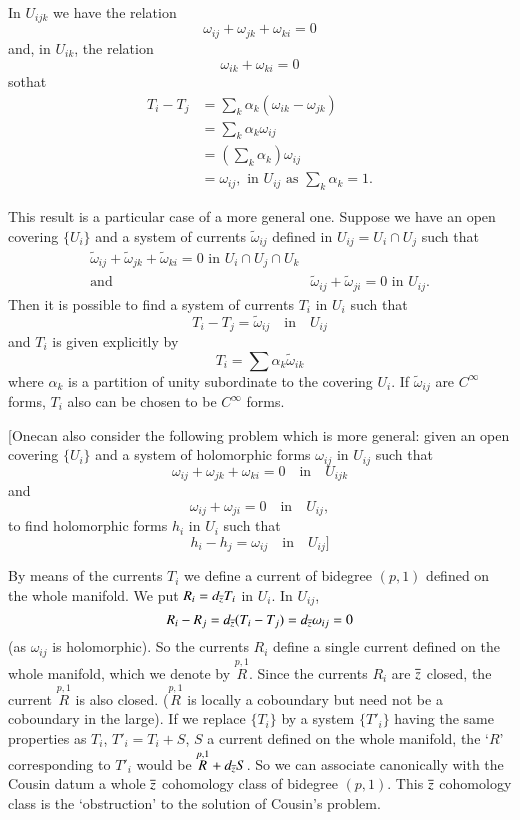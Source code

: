 In $U_{ijk}$ we have the relation
$$
\omega_{ij}+\omega_{jk}+\omega_{ki}=0
$$
and, in $U_{ik}$, the relation
$$
\omega_{ik}+\omega_{ki}=0
$$
so\pageoriginale that
\begin{align*}
T_{i}-T_{j} &= \sum_{k}\alpha_{k}(\omega_{ik}-\omega_{jk})\\
 &= \sum_{k}\alpha_{k}\omega_{ij}\\
 &= \left(\sum_{k}\alpha_{k}\right)\omega_{ij}\\
 &= \omega_{ij}, \text{ \  in \ } U_{ij} \text{ \  as \ }
\sum_{k}\alpha_{k}=1. 
\end{align*}

This result is a particular case of a more general one. Suppose we
have an open covering $\{U_{i}\}$ and a system of currents
$\widetilde{\omega}_{ij}$ defined in $U_{ij}=U_{i}\cap U_{j}$ such
that
\begin{align*}
 \widetilde{\omega}_{ij}
 +\widetilde{\omega}_{jk}+\widetilde{\omega}_{ki}=0 \text{ \  in \ }
 U_{i}\cap U_{j}\cap U_{k}\\
\text{and}\quad &\widetilde{\omega}_{ij}+\widetilde{\omega}_{ji}=0
\text{ \  in \ } U_{ij}.
\end{align*}
Then it is possible to find a system of currents $T_{i}$ in $U_{i}$
such that
$$
T_{i}-T_{j}=\widetilde{\omega}_{ij}\quad\text{in}\quad U_{ij}
$$
and $T_{i}$ is given explicitly by
$$
T_{i}=\sum \alpha_{k}\widetilde{\omega}_{ik}
$$
where $\alpha_{k}$ is a partition of unity subordinate to the covering
$U_{i}$. If $\widetilde{\omega}_{ij}$ are $C^{\infty}$ forms, $T_{i}$
also can be chosen to be $C^{\infty}$ forms. 

[One\pageoriginale can also consider the following problem which is
  more general: given an open covering $\{U_{i}\}$ and a system of
  holomorphic forms $\omega_{ij}$ in $U_{ij}$ such that
$$
\omega_{ij}+\omega_{jk}+\omega_{ki}=0\quad\text{in}\quad U_{ijk}
$$
and
$$
\omega_{ij}+\omega_{ji}=0\quad\text{in}\quad U_{ij},
$$
to find holomorphic forms $h_{i}$ in $U_{i}$ such that
$$
h_{i}-h_{j}=\omega_{ij}\quad\text{in}\quad U_{ij}]
$$

By means of the currents $T_{i}$ we define a current of bidegree
$(p,1)$ defined on the whole manifold. We put $R_{i}=d_{\overline{z}}T_{i}$
in $U_{i}$. In $U_{ij}$,
$$
R_{i}-R_{j}=d_{\overline{z}}(T_{i}-T_{j})=d_{\overline{z}}\omega_{ij}=0
$$
(as $\omega_{ij}$ is holomorphic). So the currents $R_{i}$ define a
single current defined on the whole manifold, which we denote by
$\overset{p,1}{R}$. Since the currents $R_{i}$ are $\overline{z}$ closed,
the current $\overset{p,1}{R}$ is also closed. ($\overset{p,1}{R}$ is
locally a coboundary but need not be a coboundary in the large). If we
replace $\{T_{i}\}$ by a system $\{T'_{i}\}$ having the same
properties as $T_{i}$, $T'_{i}=T_{i}+S$, $S$ a current defined on the
whole manifold, the `$R$' corresponding to $T'_{i}$ would be
$\overset{p,1}{R}+d_{\overline{z}}S$. So we can associate canonically with
the Cousin datum a whole $\overline{z}$ cohomology class of bidegree
$(p,1)$. This $\overline{z}$ cohomology class is the `obstruction' to the
solution of Cousin's problem.

